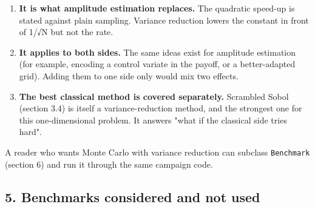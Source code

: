 \documentclass[
  10pt,
]{article}
\providecommand{\tightlist}{%
  \setlength{\itemsep}{0pt}\setlength{\parskip}{0pt}}
\begin{document}
\begin{enumerate}
\def\labelenumi{\arabic{enumi}.}
\tightlist
\item
  \textbf{It is what amplitude estimation replaces.} The quadratic
  speed-up is stated against plain sampling. Variance reduction lowers
  the constant in front of 1/√N but not the rate.
\item
  \textbf{It applies to both sides.} The same ideas exist for amplitude
  estimation (for example, encoding a control variate in the payoff, or
  a better-adapted grid). Adding them to one side only would mix two
  effects.
\item
  \textbf{The best classical method is covered separately.} Scrambled
  Sobol (section 3.4) is itself a variance-reduction method, and the
  strongest one for this one-dimensional problem. It answers "what if
  the classical side tries hard".
\end{enumerate}

A reader who wants Monte Carlo with variance reduction can subclass
\texttt{Benchmark} (section 6) and run it through the same campaign
code.

\hypertarget{5-benchmarks-considered-and-not-used}{%
\subsection{5. Benchmarks considered and not
used}\label{5-benchmarks-considered-and-not-used}}
\end{document}
